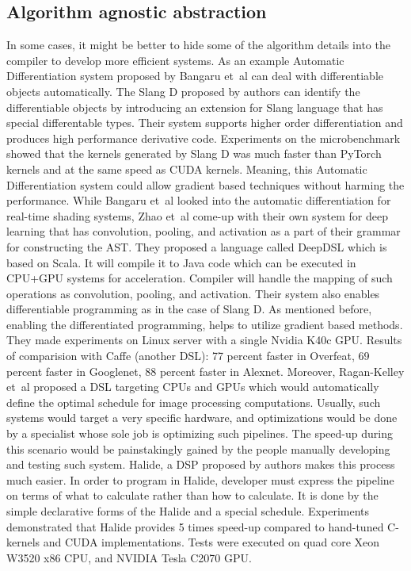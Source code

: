 \documentclass[conference]{IEEEtran}
\begin{document}
\subsection{Algorithm agnostic abstraction}
In some cases, it might be better to hide some of the algorithm details into the compiler to develop more efficient systems. As an example Automatic Differentiation system proposed by Bangaru et~al \cite{ref4} can deal with differentiable objects automatically. The Slang D proposed by authors can identify the differentiable objects by introducing an extension for Slang language that has special differentable types. Their system supports higher order differentiation and produces high performance derivative code. Experiments on the microbenchmark showed that the kernels generated by Slang D was much faster than PyTorch kernels and at the same speed as CUDA kernels. Meaning, this Automatic Differentiation system could allow gradient based techniques without harming the performance. While Bangaru et~al \cite{ref4} looked into the automatic differentiation for real-time shading systems, Zhao et~al \cite{ref7} come-up with their own system for deep learning that has convolution, pooling, and activation as a part of their grammar for constructing the AST. They proposed a language called DeepDSL which is based on Scala. It will compile it to Java code which can be executed in CPU+GPU systems for acceleration. Compiler will handle the mapping of such operations as convolution, pooling, and activation. Their system also enables differentiable programming as in the case of Slang D. As mentioned before, enabling the differentiated programming, helps to utilize gradient based methods. They made experiments on Linux server with a single Nvidia K40c GPU. Results of comparision with Caffe (another DSL): 77 percent faster in Overfeat, 69 percent faster in Googlenet, 88 percent faster in Alexnet. Moreover, Ragan-Kelley et~al \cite{ref12} proposed a DSL targeting CPUs and GPUs which would automatically define the optimal schedule for image processing computations. Usually, such systems would target a very specific hardware, and optimizations would be done by a specialist whose sole job is optimizing such pipelines. The speed-up during this scenario would be painstakingly gained by the people manually developing and testing such system. Halide, a DSP proposed by authors makes this process much easier. In order to program in Halide, developer must express the pipeline on terms of what to calculate rather than how to calculate. It is done by the simple declarative forms of the Halide and a special schedule. Experiments demonstrated that Halide provides 5 times speed-up compared to hand-tuned C-kernels and CUDA implementations. Tests were executed on quad core Xeon W3520 x86 CPU, and NVIDIA Tesla C2070 GPU.        
\end{document}
